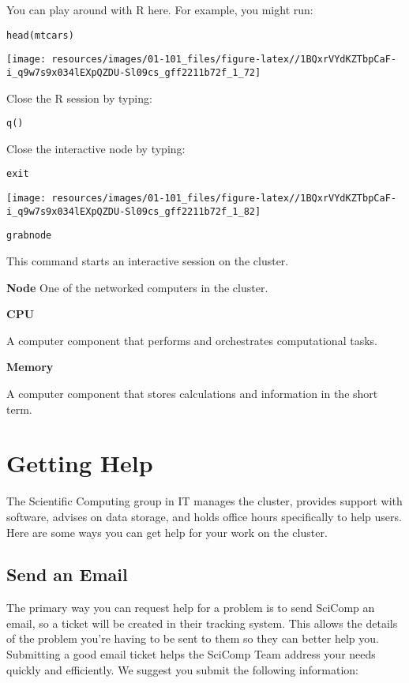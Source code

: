 \documentclass[
]{book}
\begin{document}
You can play around with R here. For example, you might run:

\begin{verbatim}
head(mtcars)
\end{verbatim}

\texttt{[image: resources/images/01-101\_files/figure-latex//1BQxrVYdKZTbpCaF-i\_q9w7s9x034lEXpQZDU-Sl09cs\_gff2211b72f\_1\_72]}

Close the R session by typing:

\begin{verbatim}
q()
\end{verbatim}

Close the interactive node by typing:

\begin{verbatim}
exit
\end{verbatim}

\texttt{[image: resources/images/01-101\_files/figure-latex//1BQxrVYdKZTbpCaF-i\_q9w7s9x034lEXpQZDU-Sl09cs\_gff2211b72f\_1\_82]}

\texttt{grabnode}

This command starts an interactive session on the cluster.

\textbf{Node}
One of the networked computers in the cluster.

\textbf{CPU}

A computer component that performs and orchestrates computational tasks.

\textbf{Memory}

A computer component that stores calculations and information in the short term.

\hypertarget{help}{%
\chapter{Getting Help}\label{help}}

The Scientific Computing group in IT manages the cluster, provides support with software, advises on data storage, and holds office hours specifically to help users. Here are some ways you can get help for your work on the cluster.

\hypertarget{send-an-email}{%
\section*{Send an Email}\label{send-an-email}}

The primary way you can request help for a problem is to send SciComp an email, so a ticket will be created in their tracking system. This allows the details of the problem you're having to be sent to them so they can better help you. Submitting a good email ticket helps the SciComp Team address your needs quickly and efficiently. We suggest you submit the following information:
\end{document}
